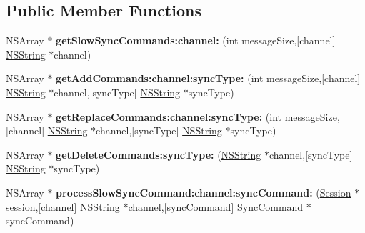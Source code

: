 \subsection*{\-Public \-Member \-Functions}
\begin{DoxyCompactItemize}
\item 
\hypertarget{interface_sync_engine_a6e7142c02c950dab0f20aa3df95ee8b3}{
\-N\-S\-Array $\ast$ {\bfseries get\-Slow\-Sync\-Commands\-:channel\-:} (int message\-Size,\mbox{[}channel\mbox{]} \hyperlink{class_n_s_string}{\-N\-S\-String} $\ast$channel)}
\label{interface_sync_engine_a6e7142c02c950dab0f20aa3df95ee8b3}

\item 
\hypertarget{interface_sync_engine_ac60bcac2fe8723bfb8dfa764e4fbccd1}{
\-N\-S\-Array $\ast$ {\bfseries get\-Add\-Commands\-:channel\-:sync\-Type\-:} (int message\-Size,\mbox{[}channel\mbox{]} \hyperlink{class_n_s_string}{\-N\-S\-String} $\ast$channel,\mbox{[}sync\-Type\mbox{]} \hyperlink{class_n_s_string}{\-N\-S\-String} $\ast$sync\-Type)}
\label{interface_sync_engine_ac60bcac2fe8723bfb8dfa764e4fbccd1}

\item 
\hypertarget{interface_sync_engine_a4af882328e810b64b5cd65e2619b57f1}{
\-N\-S\-Array $\ast$ {\bfseries get\-Replace\-Commands\-:channel\-:sync\-Type\-:} (int message\-Size,\mbox{[}channel\mbox{]} \hyperlink{class_n_s_string}{\-N\-S\-String} $\ast$channel,\mbox{[}sync\-Type\mbox{]} \hyperlink{class_n_s_string}{\-N\-S\-String} $\ast$sync\-Type)}
\label{interface_sync_engine_a4af882328e810b64b5cd65e2619b57f1}

\item 
\hypertarget{interface_sync_engine_af39da5ab76c8f3c55c61b36a66f639f2}{
\-N\-S\-Array $\ast$ {\bfseries get\-Delete\-Commands\-:sync\-Type\-:} (\hyperlink{class_n_s_string}{\-N\-S\-String} $\ast$channel,\mbox{[}sync\-Type\mbox{]} \hyperlink{class_n_s_string}{\-N\-S\-String} $\ast$sync\-Type)}
\label{interface_sync_engine_af39da5ab76c8f3c55c61b36a66f639f2}

\item 
\hypertarget{interface_sync_engine_a474e4b85f25287c96e3ae0538824f8e1}{
\-N\-S\-Array $\ast$ {\bfseries process\-Slow\-Sync\-Command\-:channel\-:sync\-Command\-:} (\hyperlink{interface_session}{\-Session} $\ast$session,\mbox{[}channel\mbox{]} \hyperlink{class_n_s_string}{\-N\-S\-String} $\ast$channel,\mbox{[}sync\-Command\mbox{]} \hyperlink{interface_sync_command}{\-Sync\-Command} $\ast$sync\-Command)}
\label{interface_sync_engine_a474e4b85f25287c96e3ae0538824f8e1}


\end{DoxyCompactItemize}
